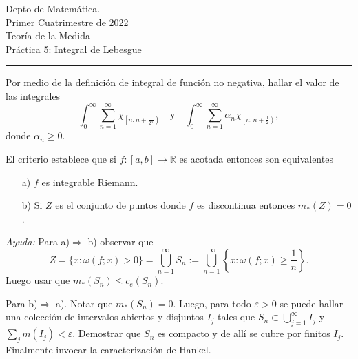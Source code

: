 \documentclass{book}
\newcommand{\rr}{\mathbb{R}}
\begin{document}


\begin{large}
\begin{bfseries} %
        \noindent Depto de Matem\'atica.\\
        Primer Cuatrimestre de 2022\\                                                                                                                                                                                                                                                                                                                                                
        Teoría de la Medida \\
        Práctica 5: Integral de Lebesgue

\end{bfseries}
\end{large}
\par\noindent\rule{\textwidth}{.5pt}

\begin{ejer}{}  Por medio de la definición de integral de función no negativa, hallar el valor de las integrales
\[
 \int_0^\infty \sum_{n=1}^\infty \chi_{\left[n,n+\frac{1}{2^n}\right)}\quad\text{y}\quad \int_0^\infty \sum_{n=1}^\infty \alpha_n\chi_{\left[n,n+\frac{1}{2}\right)},
\]
donde $\alpha_n\geq 0$. 
 
\end{ejer}

\begin{ejer}{} El criterio establece que si $f:[a,b]\to\rr$ es acotada entonces  son equivalentes
\begin{enumerate}
\item[a)] $f$ es integrable Riemann.
 \item[b)] Si $Z$ es el conjunto de puntos donde $f$ es discontinua entonces $m_*(Z)=0$. 
\end{enumerate}
\emph{Ayuda:} Para a)$\Rightarrow$ b) observar que 
\[
 Z=\{x:\omega(f;x)>0\}=\bigcup_{n=1}^{\infty}S_n:= \bigcup_{n=1}^{\infty}\left\{x:\omega(f;x)\geq \frac{1}{n}\right\}.
\]
Luego usar que $m_*(S_n)\leq c_e(S_n)$.

Para b)$\Rightarrow$ a). Notar que $m_*(S_n)=0$. Luego, para todo $\varepsilon>0$ se puede hallar una colección de intervalos abiertos y disjuntos $I_j$ tales que $S_n\subset \bigcup\limits_{j=1}^\infty I_j$ y   $\sum\limits_j m(I_j)<\varepsilon$.  Demostrar que $S_n$ es compacto y de allí se cubre por finitos $I_j$. Finalmente invocar la caracterización de Hankel.
\end{ejer}
\end{document}
